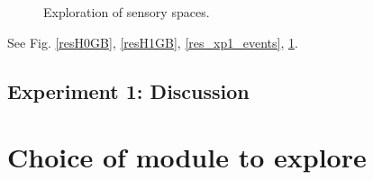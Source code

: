\documentclass[conference]{include/IEEEtran}
\begin{document}
		\begin{figure}[!t]
			\centering
			\caption{Exploration of sensory spaces.}
			\label{res_xp1_explo}
		\end{figure}
		
		
		See Fig. \ref{resH0GB}, \ref{resH1GB}, \ref{res_xp1_events}, \ref{res_xp1_explo}.
		
	
	\subsection{Experiment 1: Discussion}	
	

%
	
\section{Choice of module to explore}
\end{document}
